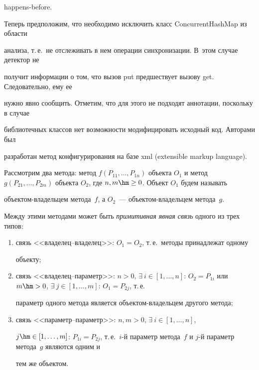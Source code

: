 happens-before.



  Теперь предположим, что необходимо исключить класс {\sf ConcurrentHashMap} из области

анализа, т.\,е.\ не отслеживать в нем операции синхронизации. В~этом случае детектор не

получит информации о том, что вызов put предшествует вызову {\sf get}. Следовательно, ему ее

нужно явно сообщить. Отметим, что для этого не подходят аннотации, поскольку в случае

библиотечных классов нет возможности модифицировать исходный код. Авторами был

разработан метод конфигурирования на базе  xml (extensible markup language).



  Рассмотрим два метода: метод $f(P_{11}, \ldots , P_{1n})$ объекта $O_1$ и метод $g(P_{21},

\ldots , P_{2m})$ объекта $O_2$, где $n, m \hm\geq 0$. Объект $O_1$ будем называть

  объек\-том-вла\-дель\-цем метода~$f$, а $O_2$~--- объек\-том-вла\-дель\-цем метода~$g$.

Между этими методами может быть \textit{примитивная явная связь} одного из трех типов:

  \begin{enumerate}[(1)]

\item связь <<владелец--владелец>>: $O_1 =  O_2$, т.\,е.\ методы принадлежат одному

объекту;

\item связь <<владелец--параметр>>: $n >0$, $\exists\ i\in [1, \ldots ,n]$: $O_2 = P_{1i}$ или $m \hm>

0$, $\exists\ j \in [1, \ldots ,m]$: $O_1 = P_{2j}$, т.\,е.\

параметр одного метода является объектом-вла\-дель\-цем другого метода;

\item связь <<параметр--параметр>>: $n, m > 0$, $\exists\ i \in [1, \ldots ,n]$,

$j\hm\in [1, \ldots ,m]$: $P_{1i}= P_{2j}$, т.\,е.\ $i$-й параметр метода~$f$ и $j$-й параметр метода~$g$ являются одним и

тем же объектом.

  \end{enumerate}



